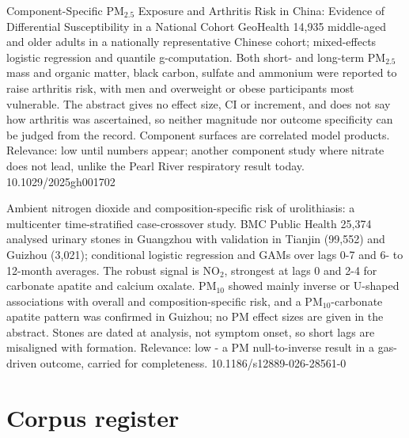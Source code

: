 \documentclass[10pt]{article}
\begin{document}
{Component-Specific PM$_{2.5}$ Exposure and Arthritis Risk in China: Evidence of Differential Susceptibility in a National Cohort}
{GeoHealth}
{14,935 middle-aged and older adults in a nationally representative Chinese cohort; mixed-effects logistic regression and quantile g-computation. Both short- and long-term PM$_{2.5}$ mass and organic matter, black carbon, sulfate and ammonium were reported to raise arthritis risk, with men and overweight or obese participants most vulnerable. The abstract gives no effect size, CI or increment, and does not say how arthritis was ascertained, so neither magnitude nor outcome specificity can be judged from the record. Component surfaces are correlated model products. Relevance: low until numbers appear; another component study where nitrate does not lead, unlike the Pearl River respiratory result today.}
{10.1029/2025gh001702}

{Ambient nitrogen dioxide and composition-specific risk of urolithiasis: a multicenter time-stratified case-crossover study.}
{BMC Public Health}
{25,374 analysed urinary stones in Guangzhou with validation in Tianjin (99,552) and Guizhou (3,021); conditional logistic regression and GAMs over lags 0-7 and 6- to 12-month averages. The robust signal is NO$_2$, strongest at lags 0 and 2-4 for carbonate apatite and calcium oxalate. PM$_{10}$ showed mainly inverse or U-shaped associations with overall and composition-specific risk, and a PM$_{10}$-carbonate apatite pattern was confirmed in Guizhou; no PM effect sizes are given in the abstract. Stones are dated at analysis, not symptom onset, so short lags are misaligned with formation. Relevance: low - a PM null-to-inverse result in a gas-driven outcome, carried for completeness.}
{10.1186/s12889-026-28561-0}

\clearpage
\section*{\sffamily\bfseries\color{Deep}Corpus register}
\vspace{-1.5mm}{\color{Amber}\rule{\linewidth}{1.1pt}}\vspace{2.5mm}



\vspace{2mm}
\end{document}
